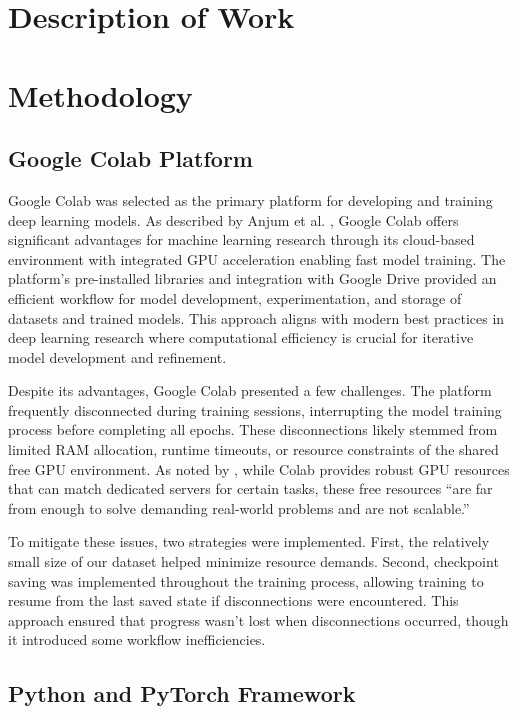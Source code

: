 \documentclass[a4paper,12pt]{article}
\begin{document}
\newpage
\section{Description of Work}

\newpage
\section{Methodology}

\subsection{Google Colab Platform}

Google Colab was selected as the primary platform for developing and training deep learning models. As described by Anjum et al. \citet{anjum2021}, Google Colab offers significant advantages for machine learning research through its cloud-based environment with integrated GPU acceleration enabling fast model training. The platform's pre-installed libraries and integration with Google Drive provided an efficient workflow for model development, experimentation, and storage of datasets and trained models. This approach aligns with modern best practices in deep learning research where computational efficiency is crucial for iterative model development and refinement.

Despite its advantages, Google Colab presented a few challenges. The platform frequently disconnected during training sessions, interrupting the model training process before completing all epochs. These disconnections likely stemmed from limited RAM allocation, runtime timeouts, or resource constraints of the shared free GPU environment. As noted by \citet{carneiro2018}, while Colab provides robust GPU resources that can match dedicated servers for certain tasks, these free resources ``are far from enough to solve demanding real-world problems and are not scalable.''

To mitigate these issues, two strategies were implemented. First, the relatively small size of our dataset helped minimize resource demands. Second, checkpoint saving was implemented throughout the training process, allowing training to resume from the last saved state if disconnections were encountered. This approach ensured that progress wasn't lost when disconnections occurred, though it introduced some workflow inefficiencies.

\subsection{Python and PyTorch Framework}
\end{document}
